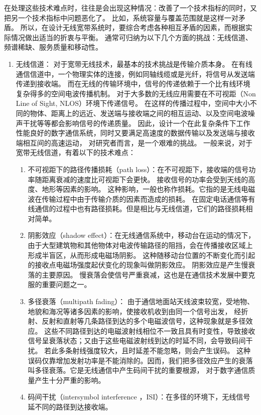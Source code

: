 在处理这些技术难点时，往往是会出现这种情况：改善了一个技术指标的同时，又把另一个技术指标中问题恶化了。
比如，系统容量与覆盖范围就是这样一对矛盾。
所以，在设计无线宽带系统时，要综合考虑各种相互矛盾的因素，而根据实际情况做出适当的折衷与平衡。
通常可归纳为以下几个方面的挑战：无线信道、频谱稀缺、服务质量和移动性。
\begin{enumerate}[1)]
    \item {无线信道：}
对于宽带无线技术，最基本的技术挑战是传输介质本身。
在有线通信信道中，一个物理实体的连接，例如同轴线缆或是光纤，将信号从发送端传递到接收端。
而在无线的传输环境中，信号的传递依赖于一个比有线环境复杂得多的空间电波传播机制。
对于大多数的无线应用需要在不可视距（Non Line of Sight, NLOS）环境下传递信号。
在这样的传播过程中，空间中大小不同的物体、距离上的远近、发送端与接收端之间的相互运动、以及空间电波噪声干扰等等都会影响信号的传递质量。
因此，设计一个在此复杂条件下工作性能良好的数字通信系统，同时又要满足高速度的数据传输以及发送端与接收端相互间的高速运动，
对研究者而言，是一个艰难的挑战。
一般来说，对于宽带无线信道，有着以下的技术难点：
\begin{enumerate}[(1)]
\item 不可视距下的路径传播损耗（path loss）：在不可视距下，接收端的信号功率随距离衰减的速度比可视距下会更快。
接收信号的功率会受到天线的高度、地形等因素的影响。
这种影响，一般也称作损耗。它指的是无线电磁波在传输过程中由于传输介质的因素而造成的损耗。
在固定电话通信等有线通信的过程中也有路径损耗。但是相比与无线信道，它们的路径损耗相对简单。
\item 阴影效应（shadow effect）：在无线通信系统中，移动台在运动的情况下，由于大型建筑物和其他物体对电波传输路径的阻挡，会在传播接收区域上形成半盲区，从而形成电磁场阴影。
这种随移动台位置的不断变化而引起的接收点电磁场强度起伏变化的现象叫做阴影效应。
阴影效应是产生慢衰落的主要原因。
慢衰落会使信号严重衰减，这也是在通信技术发展中要克服的重要问题之一。
\item 多径衰落（multipath fading）： 由于通信地面站天线波束较宽，受地物、地貌和海况等诸多因素的影响，使接收机收到由同一个信号出发，
    经折射、反射和直射等几条路径到达的多个电磁波信号，这种现象就是多径效应。
这些不同路径到达的电磁波射线相位不一致且具有时变性，导致接收信号呈衰落状态；又由于这些电磁波射线到达的时延不同，会导致码间干扰。
若此多条射线强度较大，且时延差不能忽略，则会产生误码。
这种误码仅靠增加发射功率是不能消除的。因而，我们把多径效应产生的衰落叫多径衰落。它是无线通信中产生码间干扰的重要根源，
对于数字通信质量产生十分严重的影响。
\item 码间干扰（intersymbol interference ，ISI）：在多径的环境下，无线信号延不同的路径到达接收端。

\end{enumerate}
\end{enumerate}
